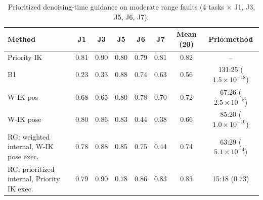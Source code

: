 \begin{table}[t]
\centering
\caption{Prioritized denoising-time guidance on moderate range faults (4 tasks $\times$ J1, J3, J5, J6, J7).}
\label{tab:rg_moderate}
\setlength{\tabcolsep}{3pt}
\begin{tabular}{lccccccc}
\toprule
Method & J1 & J3 & J5 & J6 & J7 & Mean (20) & Prio:method \\
\midrule
Priority IK & 0.81 & 0.90 & 0.80 & 0.79 & 0.81 & 0.82 & -- \\
B1 & 0.23 & 0.33 & 0.88 & 0.74 & 0.63 & 0.56 & 131:25 ($1.5\times10^{-18}$) \\
W-IK pos & 0.68 & 0.65 & 0.80 & 0.78 & 0.70 & 0.72 & 67:26 ($2.5\times10^{-5}$) \\
W-IK pose & 0.80 & 0.86 & 0.83 & 0.44 & 0.38 & 0.66 & 85:20 ($1.0\times10^{-10}$) \\
RG: weighted internal, W-IK pose exec. & 0.78 & 0.88 & 0.85 & 0.75 & 0.44 & 0.74 & 63:29 ($5.1\times10^{-4}$) \\
RG: prioritized internal, Priority IK exec. & 0.79 & 0.90 & 0.78 & 0.86 & 0.83 & 0.83 & 15:18 (0.73) \\
\bottomrule
\end{tabular}
\end{table}
